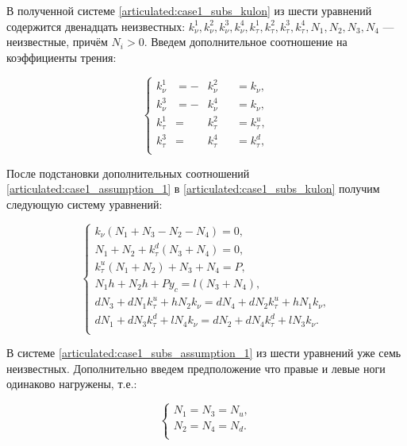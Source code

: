 В полученной системе \ref{articulated:case1_subs_kulon} из шести уравнений содержится двенадцать неизвестных:
$k_\nu^1, k_\nu^2, k_\nu^3, k_\nu^4, k_\tau^1, k_\tau^2, k_\tau^3, k_\tau^4, N_1, N_2, N_3, N_4$ --- неизвестные, причём $N_i>0$. Введем дополнительное соотношение на коэффициенты трения:

\begin{equation}
  \label{articulated:case1_assumption_1}
  \left\{
    \begin{alignedat}{3}
      k_\nu^1  &= -&k_\nu^2& &= k_\nu,\\
      k_\nu^3  &= -&k_\nu^4& &= k_\nu,\\
      k_\tau^1 &= &k_\tau^2& &= k_\tau^u,\\
      k_\tau^3 &= &k_\tau^4& &= k_\tau^d,\\
    \end{alignedat}
  \right.
\end{equation}

После подстановки дополнительных соотношений \ref{articulated:case1_assumption_1} в \ref{articulated:case1_subs_kulon} получим следующую систему уравнений:

\begin{equation}
\label{articulated:case1_subs_assumption_1}
  \left\{
    \begin{alignedat}{3}
      k_\nu(N_1 + N_3 - N_2 - N_4) = 0,\\
      N_1 + N_2 + k_\tau^d(N_3 + N_4) = 0,\\
      k_\tau^u(N_1 + N_2) + N_3 + N_4 = P,\\
      N_1h + N_2h + Py_c = l(N_3 + N_4), \\      
      dN_3 + dN_1k_\tau^u + hN_2k_\nu = dN_4 + dN_2k_\tau^u + hN_1k_\nu,\\
      dN_1 + dN_3k_\tau^d + lN_4k_\nu = dN_2 + dN_4k_\tau^d + lN_3k_\nu.\\
    \end{alignedat}
  \right.
\end{equation}

В системе \ref{articulated:case1_subs_assumption_1} из шести уравнений уже семь неизвестных. Дополнительно введем предположение что правые и левые ноги одинаково нагружены, т.е.:

\begin{equation}
\label{articulated:case1_assumption_2}
  \left\{
    \begin{alignedat}{3}
    N_1 = N_3 = N_u, \\
    N_2 = N_4 = N_d. \\
    \end{alignedat}
  \right.
\end{equation}


